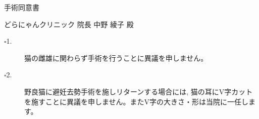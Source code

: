 \documentclass{jsarticle}
\begin{document}
\begin{center}
\Huge
\vspace{-100pt}
手術同意書
\end{center}

\vspace{10pt}
\Large
\noindent どらにゃんクリニック	院長	中野	綾子	殿

\vspace{10pt}
\large

\begin{description}
  \item[$\square$1.] 猫の雌雄に関わらず手術を行うことに異議を申しません。
  \item[$\square$2.] 野良猫に避妊去勢手術を施しリターンする場合には, 猫の耳にV字カットを施すことに異議を申しません。またV字の大きさ・形は当院に一任します。


\end{description}
\end{document}
